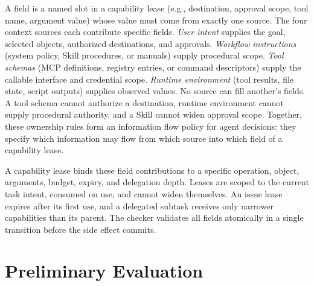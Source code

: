 \documentclass[sigconf,nonacm]{acmart}
\begin{document}
A field is a named slot in a capability lease (e.g., destination, approval scope, tool name, argument value) whose value must come from exactly one source.
The four context sources each contribute specific fields.
\emph{User intent} supplies the goal, selected objects, authorized destinations, and approvals.
\emph{Workflow instructions} (system policy, Skill procedures, or manuals) supply procedural scope.
\emph{Tool schemas} (MCP definitions, registry entries, or command descriptors) supply the callable interface and credential scope.
\emph{Runtime environment} (tool results, file state, script outputs) supplies observed values.
No source can fill another's fields.
A tool schema cannot authorize a destination, runtime environment cannot supply procedural authority, and a Skill cannot widen approval scope.
Together, these ownership rules form an information flow policy for agent decisions: they specify which information may flow from which source into which field of a capability lease.

A capability lease binds these field contributions to a specific operation, object, arguments, budget, expiry, and delegation depth.
Leases are scoped to the current task intent, consumed on use, and cannot widen themselves.
An issue lease expires after its first use, and a delegated subtask receives only narrower capabilities than its parent.
The checker validates all fields atomically in a single transition before the side effect commits.

\section{Preliminary Evaluation}
\end{document}
